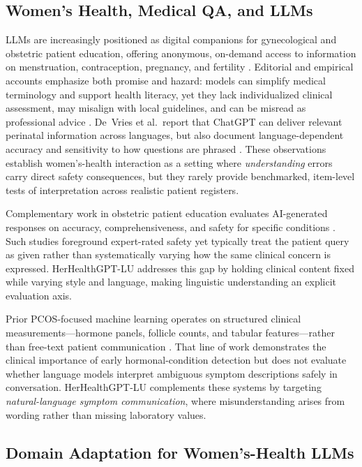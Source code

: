\subsection{Women's Health, Medical QA, and LLMs}

LLMs are increasingly positioned as digital companions for gynecological and obstetric patient education, offering anonymous, on-demand access to information on menstruation, contraception, pregnancy, and fertility \cite{recker-etal-2025-large}.
Editorial and empirical accounts emphasize both promise and hazard: models can simplify medical terminology and support health literacy, yet they lack individualized clinical assessment, may misalign with local guidelines, and can be misread as professional advice \cite{recker-etal-2025-large,devries-etal-2025-enhancing}.
De~Vries et al.\ report that ChatGPT can deliver relevant perinatal information across languages, but also document language-dependent accuracy and sensitivity to how questions are phrased \cite{devries-etal-2025-enhancing}.
These observations establish women's-health interaction as a setting where \emph{understanding} errors carry direct safety consequences, but they rarely provide benchmarked, item-level tests of interpretation across realistic patient registers.

Complementary work in obstetric patient education evaluates AI-generated responses on accuracy, comprehensiveness, and safety for specific conditions \cite{rotem-etal-2024-future}.
Such studies foreground expert-rated safety yet typically treat the patient query as given rather than systematically varying how the same clinical concern is expressed.
HerHealthGPT-LU addresses this gap by holding clinical content fixed while varying style and language, making linguistic understanding an explicit evaluation axis.

Prior PCOS-focused machine learning operates on structured clinical measurements---hormone panels, follicle counts, and tabular features---rather than free-text patient communication \cite{elmannai-etal-2023-polycystic}.
That line of work demonstrates the clinical importance of early hormonal-condition detection but does not evaluate whether language models interpret ambiguous symptom descriptions safely in conversation.
HerHealthGPT-LU complements these systems by targeting \emph{natural-language symptom communication}, where misunderstanding arises from wording rather than missing laboratory values.

\subsection{Domain Adaptation for Women's-Health LLMs}


